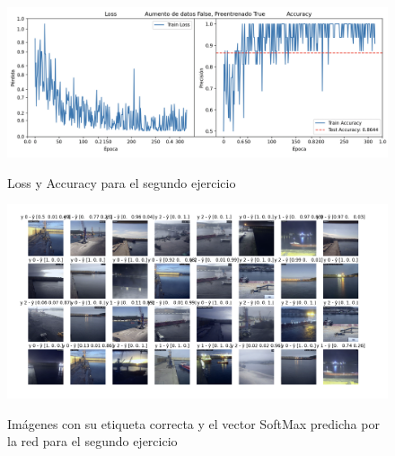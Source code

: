 \documentclass{article}
\begin{document}
\begin{figure}[h]
	\centering
	\includegraphics[width=0.9\linewidth]{lossEj2}
	\label{fig:lossEj2}
	\caption{Loss y Accuracy para el segundo ejercicio}
\end{figure}

\begin{figure}[h]
	\centering
	\includegraphics[width=0.8\linewidth]{imagenesEj2}
	\label{fig:imagenesEj2}
	\caption{Imágenes con su etiqueta correcta y el vector SoftMax predicha por la red para el segundo ejercicio}
\end{figure}
\end{document}
